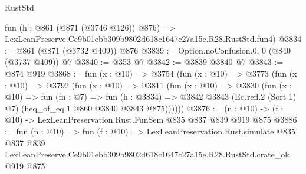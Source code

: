 \begin{lexlean}{RustStd}
\begin{coremodule}
    fun (h : @861 (@871 (@3746 @126)) @876) =>
    LexLeanPreserve.Ce9b01ebb309b9802d618c1647c27a15e.R28.RustStd.fun4)
@3834 := @861 (@871 (@3732 @409)) @876
@3839 := Option.noConfusion.{0, 0} (@840 (@3737 @409)) @7
@3840 := @353 @7
@3842 := @3839 @3840 @7
@3843 := @874 @919
@3868 := fun (x : @10) =>
  @3754
    (fun (x : @10) =>
    @3773
      (fun (x : @10) =>
      @3792
        (fun (x : @10) =>
        @3811
          (fun (x : @10) =>
          @3830
            (fun (x : @10) =>
            fun (fn : @7) =>
            fun (h : @3834) =>
            @3842 @3843 (Eq.refl.{2} (Sort 1) @7) (heq_of_eq.{1} @860 @3840 @3843 @875))))))
@3876 := (n : @10) -> (f : @10) -> LexLeanPreservation.Rust.FunSem @835 @837 @839 @919 @875
@3886 := fun (n : @10) =>
  fun (f : @10) =>
  LexLeanPreservation.Rust.simulate
    @835
    @837
    @839
    LexLeanPreserve.Ce9b01ebb309b9802d618c1647c27a15e.R28.RustStd.crate_ok
    @919
    @875
\end{coremodule}
\end{lexlean}

